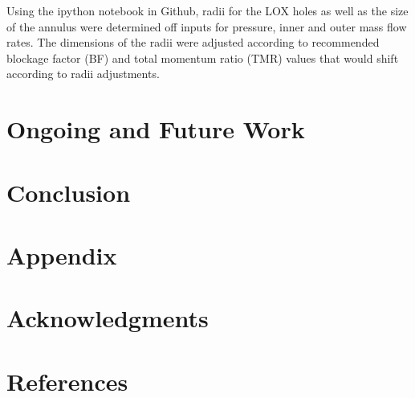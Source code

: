 \documentclass[]{aiaa-tc}%
\begin{document}
Using the ipython notebook in Github, radii for the LOX holes as well as the size of the annulus were determined off inputs for pressure, inner and outer mass flow rates. The dimensions of the radii were adjusted according to  recommended blockage factor (BF) and total momentum ratio (TMR) values that would shift according to radii adjustments. 





\section{Ongoing and Future Work}

\section{Conclusion}


\section*{Appendix}



\section*{Acknowledgments}

\section{References}
\end{document}
